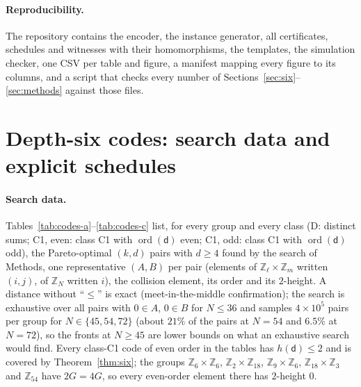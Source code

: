 \documentclass[reprint,twocolumn,superscriptaddress,nofootinbib]{revtex4-2}
\theoremstyle{plain}
\newcommand{\col}{\mathsf{d}}          %
\begin{document}
\paragraph*{Reproducibility.}
The repository contains the encoder, the instance generator, all
certificates, schedules and witnesses with their homomorphisms, the
templates, the simulation checker, one CSV per table and figure, a
manifest mapping every figure to its columns, and a script that checks
every number of Sections~\ref{sec:six}--\ref{sec:methods} against those
files.

\section{Depth-six codes: search data and explicit schedules}
\label{si:codes}

\paragraph*{Search data.}
Tables~\ref{tab:codes-a}--\ref{tab:codes-c} list, for every group and
every class (D: distinct sums; C1, even: class C1 with
$\operatorname{ord}(\col)$ even; C1, odd: class C1 with
$\operatorname{ord}(\col)$ odd), the Pareto-optimal $(k,d)$ pairs with
$d\ge4$ found by the search of Methods, one representative $(A,B)$ per
pair (elements of $\mathbb{Z}_\ell\times\mathbb{Z}_m$ written $(i,j)$, of
$\mathbb{Z}_N$ written $i$), the collision element, its order and its
$2$-height. A distance without ``$\le$'' is exact (meet-in-the-middle
confirmation); the search is exhaustive over all pairs with $0\in A$,
$0\in B$ for $N\le36$ and samples $4\times10^5$ pairs per group for
$N\in\{45,54,72\}$ (about $21\%$ of the pairs at $N=54$ and $6.5\%$ at
$N=72$), so the fronts at $N\ge45$ are lower bounds on what an exhaustive
search would find. Every class-C1 code of even order in the tables has
$h(\col)\le2$ and is covered by Theorem~\ref{thm:six}; the groups
$\mathbb{Z}_6\times\mathbb{Z}_6$, $\mathbb{Z}_2\times\mathbb{Z}_{18}$,
$\mathbb{Z}_9\times\mathbb{Z}_6$, $\mathbb{Z}_{18}\times\mathbb{Z}_3$ and
$\mathbb{Z}_{54}$ have $2G=4G$, so every even-order element there has
$2$-height $0$.
\end{document}
